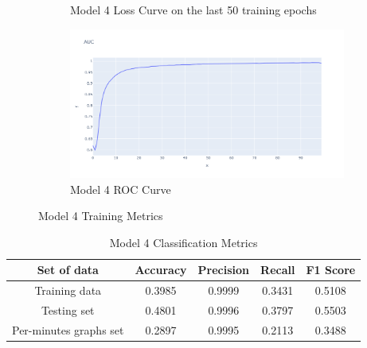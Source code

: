 \begin{figure}[H]
\begin{subfigure}{0.49\textwidth}
        \caption{Model 4 Loss Curve on the last 50 training epochs}
    \label{fig:do_1_ploss}
    \end{subfigure}
    \begin{subfigure}{0.49\textwidth}
        \centering
        \includegraphics[width=\linewidth]{figures/ev/do_1_auc.png}
        \caption{Model 4 ROC Curve}
    \label{fig:do_1_auc}
    \end{subfigure}
    \captionsetup{font=large}
\caption{Model 4 Training Metrics}
 \label{fig:4_tr}
\end{figure}
\begin{table}[H]%
\centering
\begin{tabular}{|c|c|c|c|c|}
\hline
Set of data & Accuracy & Precision & Recall & F1 Score \\
\hline
Training data & 0.3985 & 0.9999 & 0.3431 & 0.5108 \\
\hline
Testing set & 0.4801 & 0.9996 & 0.3797 & 0.5503 \\
\hline
Per-minutes graphs set & 0.2897 & 0.9995 & 0.2113 & 0.3488 \\
\hline
\end{tabular}
\caption{Model 4 Classification Metrics}
\label{M4_tab}
\end{table}
